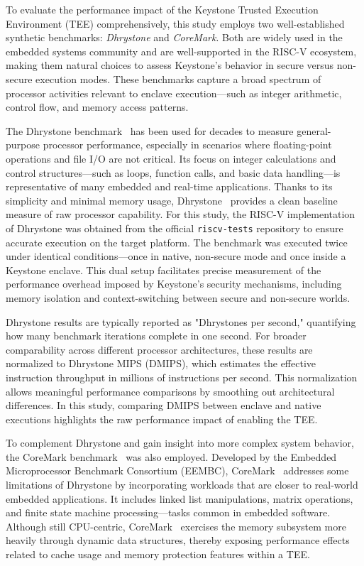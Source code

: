 To evaluate the performance impact of the Keystone Trusted Execution Environment (TEE) comprehensively, this study employs two well-established synthetic benchmarks: \textit{Dhrystone} and \textit{CoreMark}. Both are widely used in the embedded systems community and are well-supported in the RISC-V ecosystem, making them natural choices to assess Keystone’s behavior in secure versus non-secure execution modes. These benchmarks capture a broad spectrum of processor activities relevant to enclave execution—such as integer arithmetic, control flow, and memory access patterns.

The Dhrystone benchmark~\cite{weiss2002dhrystone} has been used for decades to measure general-purpose processor performance, especially in scenarios where floating-point operations and file I/O are not critical. Its focus on integer calculations and control structures—such as loops, function calls, and basic data handling—is representative of many embedded and real-time applications. Thanks to its simplicity and minimal memory usage, Dhrystone~\cite{weiss2002dhrystone} provides a clean baseline measure of raw processor capability. For this study, the RISC-V implementation of Dhrystone was obtained from the official \texttt{riscv-tests} repository to ensure accurate execution on the target platform. The benchmark was executed twice under identical conditions—once in native, non-secure mode and once inside a Keystone enclave. This dual setup facilitates precise measurement of the performance overhead imposed by Keystone’s security mechanisms, including memory isolation and context-switching between secure and non-secure worlds.

Dhrystone results are typically reported as "Dhrystones per second," quantifying how many benchmark iterations complete in one second. For broader comparability across different processor architectures, these results are normalized to Dhrystone MIPS (DMIPS), which estimates the effective instruction throughput in millions of instructions per second. This normalization allows meaningful performance comparisons by smoothing out architectural differences. In this study, comparing DMIPS between enclave and native executions highlights the raw performance impact of enabling the TEE.

To complement Dhrystone and gain insight into more complex system behavior, the CoreMark benchmark~\cite{gal2012exploring} was also employed. Developed by the Embedded Microprocessor Benchmark Consortium (EEMBC), CoreMark~\cite{gal2012exploring} addresses some limitations of Dhrystone by incorporating workloads that are closer to real-world embedded applications. It includes linked list manipulations, matrix operations, and finite state machine processing—tasks common in embedded software. Although still CPU-centric, CoreMark~\cite{gal2012exploring} exercises the memory subsystem more heavily through dynamic data structures, thereby exposing performance effects related to cache usage and memory protection features within a TEE.

